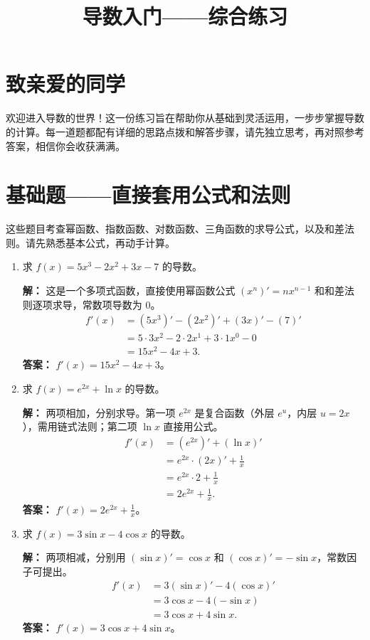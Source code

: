 \documentclass[10pt]{article}
\title{导数入门——综合练习}
\author{}
\date{}
\begin{document}
\maketitle

\section*{致亲爱的同学}
欢迎进入导数的世界！这一份练习旨在帮助你从基础到灵活运用，一步步掌握导数的计算。每一道题都配有详细的思路点拨和解答步骤，请先独立思考，再对照参考答案，相信你会收获满满。

\section{基础题——直接套用公式和法则}
这些题目考查幂函数、指数函数、对数函数、三角函数的求导公式，以及和差法则。请先熟悉基本公式，再动手计算。

\begin{enumerate}[label=\arabic*.]
    \item 求 $f(x) = 5x^3 - 2x^2 + 3x - 7$ 的导数。
    
    \textbf{解：} 这是一个多项式函数，直接使用幂函数公式 $(x^n)' = n x^{n-1}$ 和和差法则逐项求导，常数项导数为 $0$。
    \begin{align*}
        f'(x) &= (5x^3)' - (2x^2)' + (3x)' - (7)' \\
        &= 5 \cdot 3x^{2} - 2 \cdot 2x^{1} + 3 \cdot 1x^{0} - 0 \\
        &= 15x^2 - 4x + 3.
    \end{align*}
    \textbf{答案：} $f'(x) = 15x^2 - 4x + 3$。

    \item 求 $f(x) = e^{2x} + \ln x$ 的导数。
    
    \textbf{解：} 两项相加，分别求导。第一项 $e^{2x}$ 是复合函数（外层 $e^u$，内层 $u=2x$），需用链式法则；第二项 $\ln x$ 直接用公式。
    \begin{align*}
        f'(x) &= (e^{2x})' + (\ln x)' \\
        &= e^{2x} \cdot (2x)' + \frac{1}{x} \\
        &= e^{2x} \cdot 2 + \frac{1}{x} \\
        &= 2e^{2x} + \frac{1}{x}.
    \end{align*}
    \textbf{答案：} $f'(x) = 2e^{2x} + \frac{1}{x}$。

    \item 求 $f(x) = 3\sin x - 4\cos x$ 的导数。
    
    \textbf{解：} 两项相减，分别用 $(\sin x)' = \cos x$ 和 $(\cos x)' = -\sin x$，常数因子可提出。
    \begin{align*}
        f'(x) &= 3(\sin x)' - 4(\cos x)' \\
        &= 3\cos x - 4(-\sin x) \\
        &= 3\cos x + 4\sin x.
    \end{align*}
    \textbf{答案：} $f'(x) = 3\cos x + 4\sin x$。
\end{enumerate}
\end{document}
